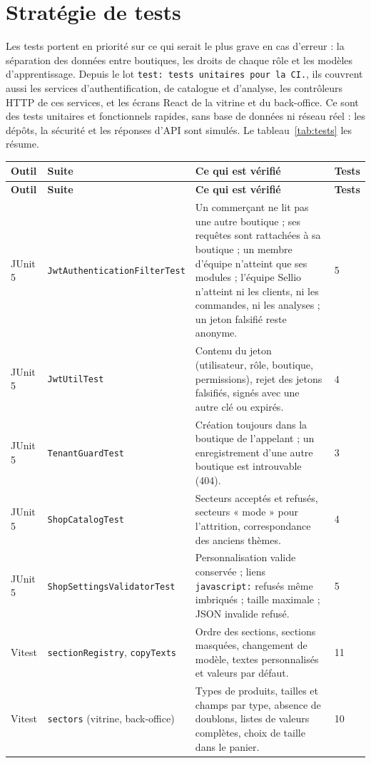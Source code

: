 \section{Stratégie de tests}
Les tests portent en priorité sur ce qui serait le plus grave en cas d'erreur : la séparation des données entre boutiques, les droits de chaque rôle et les modèles d'apprentissage. Depuis le lot \texttt{test: tests unitaires pour la CI.}, ils couvrent aussi les services d'authentification, de catalogue et d'analyse, les contrôleurs HTTP de ces services, et les écrans React de la vitrine et du back-office. Ce sont des tests unitaires et fonctionnels rapides, sans base de données ni réseau réel : les dépôts, la sécurité et les réponses d'API sont simulés. Le tableau~\ref{tab:tests} les résume.
\begin{longtable}{|p{2.4cm}|p{4.2cm}|p{7cm}|p{1.2cm}|}
\hline
\textbf{Outil} & \textbf{Suite} & \textbf{Ce qui est vérifié} & \textbf{Tests} \\
\hline
\endfirsthead
\hline
\textbf{Outil} & \textbf{Suite} & \textbf{Ce qui est vérifié} & \textbf{Tests} \\
\hline
\endhead
JUnit 5 & \texttt{JwtAuthenticationFilterTest} & Un commerçant ne lit pas une autre boutique ; ses requêtes sont rattachées à sa boutique ; un membre d'équipe n'atteint que ses modules ; l'équipe Sellio n'atteint ni les clients, ni les commandes, ni les analyses ; un jeton falsifié reste anonyme. & 5 \\
\hline
JUnit 5 & \texttt{JwtUtilTest} & Contenu du jeton (utilisateur, rôle, boutique, permissions), rejet des jetons falsifiés, signés avec une autre clé ou expirés. & 4 \\
\hline
JUnit 5 & \texttt{TenantGuardTest} & Création toujours dans la boutique de l'appelant ; un enregistrement d'une autre boutique est introuvable (404). & 3 \\
\hline
JUnit 5 & \texttt{ShopCatalogTest} & Secteurs acceptés et refusés, secteurs « mode » pour l'attrition, correspondance des anciens thèmes. & 4 \\
\hline
JUnit 5 & \texttt{ShopSettingsValidatorTest} & Personnalisation valide conservée ; liens \texttt{javascript:} refusés même imbriqués ; taille maximale ; JSON invalide refusé. & 5 \\
\hline
Vitest & \texttt{sectionRegistry}, \texttt{copyTexts} & Ordre des sections, sections masquées, changement de modèle, textes personnalisés et valeurs par défaut. & 11 \\
\hline
Vitest & \texttt{sectors} (vitrine, back-office) & Types de produits, tailles et champs par type, absence de doublons, listes de valeurs complètes, choix de taille dans le panier. & 10 \\

\end{longtable}
